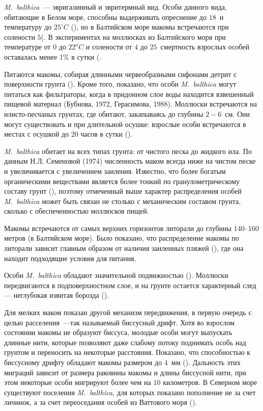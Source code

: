 \textit{M.~balthica}~--- эвригалинный и эвритермный вид. 
Особи данного вида, обитающие в Белом море, способны выдерживать опреснение до $18$\permil\ и температуру до $25^{\circ}C$ (\cite{Naumov_2006}), но в Балтийском море макомы встречаются при солености $5$\permil (\cite{Karpevich_Shurin_1970}.
В экспериментах на моллюсках из Балтийского моря при температуре от $0$ до $22^oC$ и солености от $4$ до $25$\permil\ смертность взрослых особей оставалась менее 1\% в сутки (\cite{Karpevich_1968}.

Питаются макомы, собирая длинными червеобразными сифонами детрит с поверхности грунта (\cite{Naumov_2006}). 
Кроме того, показано, что особи \textit{M.~balthica} могут питаться как фильтраторы, когда в придонном слое воды находится взвешенный пищевой материал (Бубнова, 1972, Герасимова, 1988). 
Моллюски встречаются на илисто-песчаных грунтах, где обитают, закапываясь до глубины $2-6$~см. 
Они могут существовать и при длительной осушке: взрослые особи встречаются в местах с осушкой до 20 часов в сутки (\cite{Sveshnikov_1963}). 

\textit{M.~balthica} обитает на всех типах грунта: от чистого песка до жидкого ила. 
По данным Н.Л. Семеновой (1974) численность маком всегда ниже на чистом песке и увеличивается с увеличением заиления. 
Известно, что более богатым органическими веществами является более тонкий по гранулометрическому составу грунт (\cite{Bubnova_1972}), поэтому отмеченный выше характер распределения особей \textit{M.~balthica} может быть связан не столько с механическим составом грунта, сколько с обеспеченностью моллюсков пищей.

Макомы встречаются от самых верхних горизонтов литорали до глубины 140–160 метров (в Балтийском море). 
Было показано, что распределение макомы по литорали зависит главным образом от наличия заиленных пляжей (\cite{Semenova_1974}), где она находит подходящие условия для питания. 
	
Особи \textit{M.~balthica} обладают значительной подвижностью (\cite{Sveshnikov_1963}). 
Моллюски передвигаются в подповерхностном слое, и на грунте остается характерный след --- неглубокая извитая борозда (\cite{Naumov_2006}). 

Для мелких маком показан другой механизм передвижения, в первую очередь с целью расселения~---так называемый биссусный дрифт. 
Хотя во взрослом состоянии макомы не образуют биссуса, молодые особи могут выпускать длинные нити, которые позволяют даже слабому потоку поднимать особь над грунтом и переносить на некоторые расстояния. 
Показано, что способностью к биссусному дрифту обладают макомы размером до $4$~мм (\cite{Armonies_Hellwig-Armonies_1992}). 
Дальность этих миграций зависит от размера раковины макомы и длины биссусной нити, при этом некоторые особи мигрируют более чем на $10$ километров. 
В Северном море существуют поселения \textit{M.~balthica}, для которых показано пополнение не за счет личинок, а за счет переоседания особей из Ваттового моря (\cite{Beukema_deVlas_1989}).


